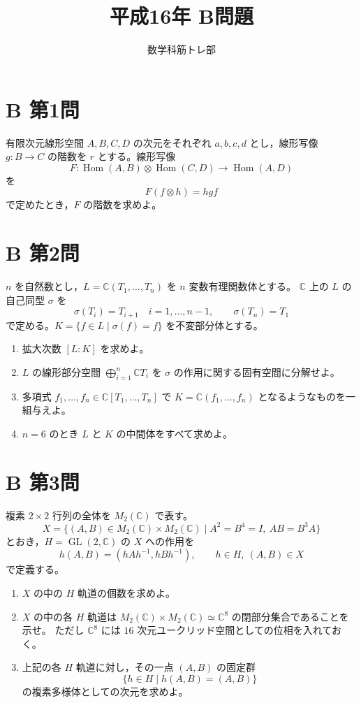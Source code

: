 \documentclass[11pt,a4paper]{ltjsarticle}
\title{平成16年 B問題}
\author{数学科筋トレ部}
\date{}
\DeclareMathOperator{\Hom}{Hom}
\begin{document}
\maketitle

\section*{B 第1問}
有限次元線形空間 \(A,B,C,D\) の次元をそれぞれ \(a,b,c,d\) とし，線形写像
\(g:B \to C\) の階数を \(r\) とする。線形写像
\[
  F:\Hom(A,B)\otimes \Hom(C,D)
    \longrightarrow \Hom(A,D)
\]
を
\[
  F(f\otimes h)=hgf
\]
で定めたとき，\(F\) の階数を求めよ。

\section*{B 第2問}
\(n\) を自然数とし，\(L=\mathbb{C}(T_1,\ldots,T_n)\) を \(n\) 変数有理関数体とする。
\(\mathbb{C}\) 上の \(L\) の自己同型 \(\sigma\) を
\[
  \sigma(T_i)=T_{i+1}\quad i=1,\ldots,n-1,
  \qquad
  \sigma(T_n)=T_1
\]
で定める。\(K=\{f\in L\mid \sigma(f)=f\}\) を不変部分体とする。

\begin{enumerate}
  \item 拡大次数 \([L:K]\) を求めよ。
  \item \(L\) の線形部分空間 \(\bigoplus_{i=1}^{n}\mathbb{C}T_i\) を \(\sigma\) の作用に関する固有空間に分解せよ。
  \item 多項式 \(f_1,\ldots,f_n \in \mathbb{C}[T_1,\ldots,T_n]\) で \(K=\mathbb{C}(f_1,\ldots,f_n)\) となるようなものを一組与えよ。
  \item \(n=6\) のとき \(L\) と \(K\) の中間体をすべて求めよ。
\end{enumerate}

\section*{B 第3問}
複素 \(2\times2\) 行列の全体を \(M_2(\mathbb{C})\) で表す。
\[
  X=\{(A,B)\in M_2(\mathbb{C})\times M_2(\mathbb{C})
    \mid A^2=B^4=I,\ AB=B^3A\}
\]
とおき，\(H=\operatorname{GL}(2,\mathbb{C})\) の \(X\) への作用を
\[
  h(A,B)=(hAh^{-1},hBh^{-1}),
  \qquad h\in H,\ (A,B)\in X
\]
で定義する。

\begin{enumerate}
  \item \(X\) の中の \(H\) 軌道の個数を求めよ。
  \item \(X\) の中の各 \(H\) 軌道は
  \(M_2(\mathbb{C})\times M_2(\mathbb{C})\simeq \mathbb{C}^8\) の閉部分集合であることを示せ。
  ただし \(\mathbb{C}^8\) には \(16\) 次元ユークリッド空間としての位相を入れておく。
  \item 上記の各 \(H\) 軌道に対し，その一点 \((A,B)\) の固定群
  \[
    \{h\in H\mid h(A,B)=(A,B)\}
  \]
  の複素多様体としての次元を求めよ。
\end{enumerate}
\end{document}
